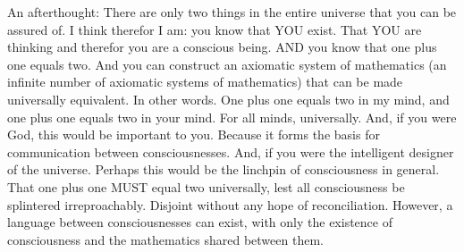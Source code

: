 \documentclass{article}
\begin{document}
An afterthought:
There are only two things in the entire universe that you can be assured of. I think therefor I am: you know that YOU exist. That YOU are thinking and therefor you are a conscious being. AND you know that one plus one equals two. And you can construct an axiomatic system of mathematics (an infinite number of axiomatic systems of mathematics) that can be made universally equivalent. In other words. One plus one equals two in my mind, and one plus one equals two in your mind. For all minds, universally. And, if you were God, this would be important to you. Because it forms the basis for communication between consciousnesses. And, if you were the intelligent designer of the universe. Perhaps this would be the linchpin of consciousness in general. That one plus one MUST equal two universally, lest all consciousness be splintered irreproachably. Disjoint without any hope of reconciliation. However, a language between consciousnesses can exist, with only the existence of consciousness and the mathematics shared between them.
\end{document}
